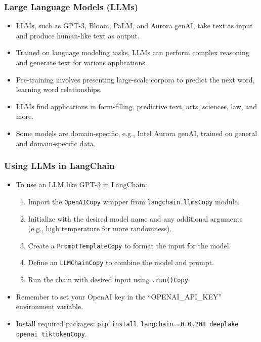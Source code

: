 \begin{frame}[fragile]
\frametitle{Large Language Models (LLMs)}

\begin{itemize}
    \item LLMs, such as GPT-3, Bloom, PaLM, and Aurora genAI, take text as input and produce human-like text as output.
    \item Trained on language modeling tasks, LLMs can perform complex reasoning and generate text for various applications.
    \item Pre-training involves presenting large-scale corpora to predict the next word, learning word relationships.
    \item LLMs find applications in form-filling, predictive text, arts, sciences, law, and more.
    \item Some models are domain-specific, e.g., Intel Aurora genAI, trained on general and domain-specific data.
\end{itemize}

\end{frame}

\begin{frame}[fragile]
\frametitle{Using LLMs in LangChain}

\begin{itemize}
    \item To use an LLM like GPT-3 in LangChain:
    \begin{enumerate}
        \item Import the \texttt{OpenAICopy} wrapper from \texttt{langchain.llmsCopy} module.
        \item Initialize with the desired model name and any additional arguments (e.g., high temperature for more randomness).
        \item Create a \texttt{PromptTemplateCopy} to format the input for the model.
        \item Define an \texttt{LLMChainCopy} to combine the model and prompt.
        \item Run the chain with desired input using \texttt{.run()Copy}.
    \end{enumerate}
    \item Remember to set your OpenAI key in the “OPENAI\_API\_KEY” environment variable.
    \item Install required packages: \texttt{pip install langchain==0.0.208 deeplake openai tiktokenCopy}.
\end{itemize}

\end{frame}

